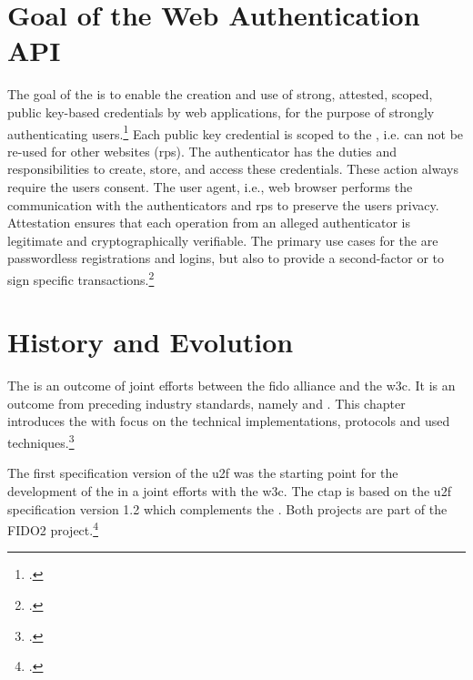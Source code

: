 \section{Goal of the Web Authentication API}

The goal of the \wa{} is to enable \frqq the creation and use of strong, attested, scoped, public key-based credentials by web applications, for the purpose of strongly authenticating users\flqq.\footcites[See][Abstract]{w3c} Each public key credential is scoped to the , i.e. can not be re-used for other websites (\glspl{rp}). The authenticator has the duties and responsibilities to create, store, and access these credentials. These action always require the users consent. The user agent, i.e., web browser performs the communication with the authenticators and \glspl{rp} to preserve the users privacy. Attestation ensures that each operation from an alleged authenticator is legitimate and cryptographically verifiable. The primary use cases for the \wa{} are passwordless registrations and logins, but also to provide a second-factor or to sign specific transactions.\footcites[See][Abstract, Chapter 1.2]{w3c}

\section{History and Evolution}

The \wa{} is an outcome of joint efforts between	 the \gls{fido} alliance and the \gls{w3c}. It is an outcome from preceding industry standards, namely  and . This chapter introduces the \wa{} with focus on the technical implementations, protocols and used techniques.\footcites[See][24]{fido-ct-3}

The first specification version of the \gls{u2f} was the starting point for the development of the \wa{} in a joint efforts with the \gls{w3c}. The \gls{ctap} is based on the \gls{u2f} specification version 1.2 which complements the \wa. Both projects are part of the FIDO2 project.\footcite[See][169--170]{grimes2017hacking}
